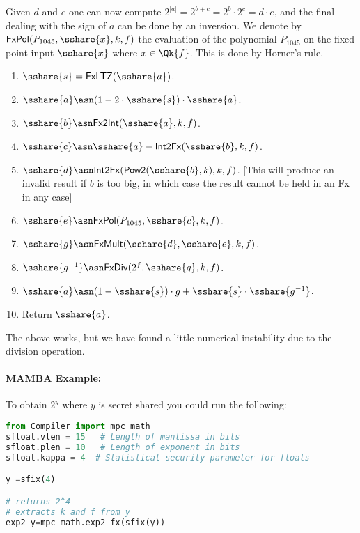 Given $d$ and $e$ one can now compute
$2^{|a|}=2^{b+c}=2^b \cdot 2^c=d \cdot e$,
and the final dealing with the sign of $a$ can
be done by an inversion.
We denote by $\mathsf{FxPol}(P_{1045},\sshare{x},k,f)$ the evaluation
of the polynomial $P_{1045}$ on the fixed point input $\sshare{x}$
where $x \in \Qk{f}$. This is done by Horner's rule.
\begin{enumerate}
\item $\sshare{s}=\mathsf{FxLTZ}(\sshare{a})$.
\item $\sshare{a} \asn (1-2 \cdot \sshare{s}) \cdot \sshare{a}$.
\item $\sshare{b} \asn \mathsf{Fx2Int}(\sshare{a},k,f)$.
\item $\sshare{c} \asn \sshare{a}-\mathsf{Int2Fx}(\sshare{b},k,f)$.
\item $\sshare{d} \asn \mathsf{Int2Fx}(\mathsf{Pow2}(\sshare{b},k),k,f)$. [This will produce an invalid result if $b$ is too big, in which case the result cannot be held in an Fx in any case]
\item $\sshare{e} \asn \mathsf{FxPol}(P_{1045},\sshare{c},k,f)$.
\item $\sshare{g} \asn \mathsf{FxMult}(\sshare{d},\sshare{e},k,f)$.
\item $\sshare{g^{-1}} \asn \mathsf{FxDiv}(2^f,\sshare{g},k,f)$.
\item $\sshare{a} \asn (1-\sshare{s}) \cdot g+ \sshare{s} \cdot \sshare{g^{-1}}$.
\item Return $\sshare{a}$.
\end{enumerate}
The above works, but we have found a little numerical
instability due to the division operation. 
\paragraph{MAMBA Example:} To obtain $2^y$ where $y$ is secret shared you could run the following: 
\begin{lstlisting}[language={python}]
from Compiler import mpc_math
sfloat.vlen = 15   # Length of mantissa in bits
sfloat.plen = 10   # Length of exponent in bits
sfloat.kappa = 4  # Statistical security parameter for floats

y =sfix(4)

# returns 2^4 
# extracts k and f from y
exp2_y=mpc_math.exp2_fx(sfix(y))
\end{lstlisting}

